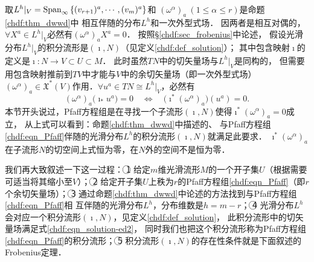 取$L^h|_V = {\rm Span}_{\infty} \left\{(v_{r+1})^a,\cdots, (v_m)^a \right\}$和
$(\omega^\alpha)_a \ (1 \leqslant \alpha \leqslant r)$是命题\ref{chdf:thm_dwwd}中
相互伴随的分布$L^h$和一次外型式场．
因两者是相互对偶的，$\forall X^a\in L^h|_V$必然有$(\omega^\alpha)_a X^a =0$．
按照\S \ref{chdf:sec_frobenius}中论述，
假设光滑分布$L^h|_V$的积分流形是$(\imath,N)$（见定义\ref{chdf:def_solution}）；
其中包含映射$\imath$的定义是$\imath:N\to V\subset U \subset M$．
此时虽然$TN$中的切矢量场与$L^h|_V$是同构的，
但需要用包含映射推前到$TV$中才能与$V$中的余切矢量场（即一次外型式场）
$(\omega^\alpha)_a \in \mathfrak{X}^*(V)$作用．$\forall u^a\in TN \cong L^h|_V$，必然有
\begin{equation}\label{chdf:eqn_solution-ed2}
    (\omega^\alpha)_a \bigl(\imath_{*}u^a\bigr) =0 \quad \Leftrightarrow \quad
    \bigl(\imath^*(\omega^\alpha)_a\bigr) (u^a) =0.
\end{equation}
本节开头说过，Pfaff方程组是在寻找一个子流形$(\imath,N)$使得$\imath^*(\omega^\alpha)_a=0$成立，
从上式可以看到：命题\ref{chdf:thm_dwwd}中描述的、
与Pfaff方程组\eqref{chdf:eqn_Pfaff}伴随的光滑分布$L^h$的积分流形$(\imath,N)$就满足此要求．
$\imath^*(\omega^\alpha)_a$在子流形$N$的切空间上式恒为零，在$N$外的空间不是恒为零．

我们再大致叙述一下这一过程：
\textcircled{1} 给定$m$维光滑流形$M$的一个开子集$U$（根据需要可适当将其缩小至$V$）；
\textcircled{2} 给定开子集$U$上秩为$r$的Pfaff方程组\eqref{chdf:eqn_Pfaff}（即$r$个余切矢量场）；
\textcircled{3} 通过命题\ref{chdf:thm_dwwd}中论述的方法找到与Pfaff方程组\eqref{chdf:eqn_Pfaff}相
互伴随的光滑分布$L^h$，分布维数是$h=m-r$；
\textcircled{4} 光滑分布$L^h$会对应一个积分流形$(\imath,N)$，见定义\ref{chdf:def_solution}，
此积分流形中的切矢量场满足式\eqref{chdf:eqn_solution-ed2}，
同时我们也把这个积分流形称为Pfaff方程组\eqref{chdf:eqn_Pfaff}的积分流形；
\textcircled{5} 积分流形$(\imath,N)$的存在性条件就是下面叙述的Frobenius定理．

